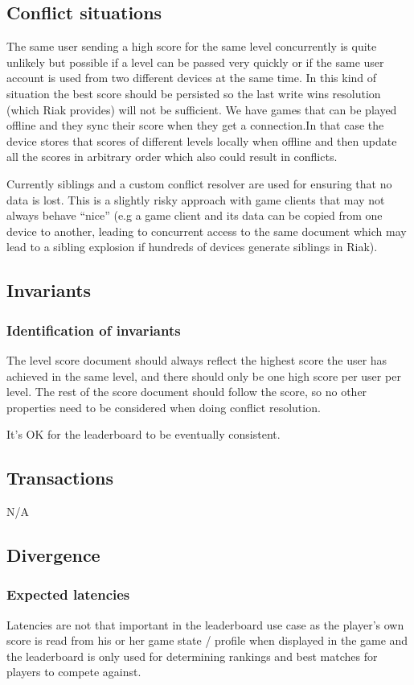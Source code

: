 \documentclass[11pt,a4paper]{report}
\begin{document}
\subsection{Conflict situations}
The same user sending a high score for the same level concurrently is quite unlikely but possible if a level can be passed very quickly or if the same user account is used from two different devices at the same time. In this kind of situation the best score should be persisted so the last write wins resolution (which Riak provides) will not be sufficient.
We have games that can be played offline and they sync their score when they get a connection.In that case the device stores that scores of different levels locally when offline and then update all the scores in arbitrary order which also could result in conflicts.


Currently siblings and a custom conflict resolver are used for ensuring that no data is lost. This is a slightly risky approach with game clients that may not always behave ``nice'' (e.g a game client and its data can be copied from one device to another, leading to concurrent access to the same document which may lead to a sibling explosion if hundreds of devices generate siblings in Riak).

\subsection{Invariants}
\subsubsection{Identification of invariants}
The level score document should always reflect the highest score the user has achieved in the same level, and there should only be one high score per user per level. The rest of the score document should follow the score, so no other properties need to be considered when doing conflict resolution.

It's OK for the leaderboard to be eventually consistent.
\subsection{Transactions}
N/A
\subsection{Divergence}
\subsubsection{Expected latencies}
Latencies are not that important in the leaderboard use case as the player's own score is read from his or her game state / profile when displayed in the game and the leaderboard is only used for determining rankings and best matches for players to compete against.
\end{document}
